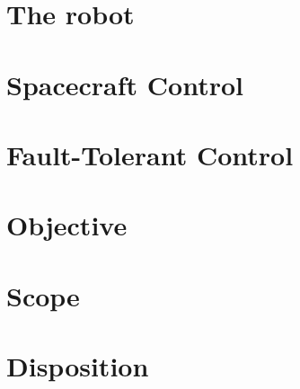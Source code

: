 {
\let\clearpage\relax
\let\newpage\relax
\let\pagebreak\relax


\section{The robot}

\label{The Slider}

\section{Spacecraft Control}


\section{Fault-Tolerant Control}


\section{Objective}


\section{Scope}


\section{Disposition}



}




























